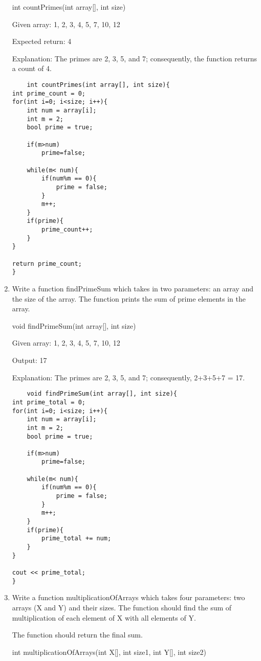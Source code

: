 \documentclass{article}
\begin{document}
\begin{enumerate}
int countPrimes(int array[], int size)

Given array: {1, 2, 3, 4, 5, 7, 10, 12}

Expected return: 4

Explanation: The primes are 2, 3, 5, and 7; consequently, the function returns a count of 4.

\begin{lstlisting}
	int countPrimes(int array[], int size){
int prime_count = 0;
for(int i=0; i<size; i++){
    int num = array[i];
    int m = 2;
    bool prime = true;
    
    if(m>num)
        prime=false;
    
    while(m< num){
        if(num%m == 0){
            prime = false;
        }
        m++;
    }
    if(prime){
        prime_count++;
    }
}

return prime_count;
}
\end{lstlisting}
\item Write a function findPrimeSum which takes in two parameters: an array and the size of the array. The function prints the sum of prime elements in the array.

void findPrimeSum(int array[], int size)

Given array: {1, 2, 3, 4, 5, 7, 10, 12}

Output: 17


Explanation: The primes are 2, 3, 5, and 7; consequently, 2+3+5+7 = 17.
\begin{lstlisting}
	void findPrimeSum(int array[], int size){
int prime_total = 0;
for(int i=0; i<size; i++){
    int num = array[i];
    int m = 2;
    bool prime = true;
    
    if(m>num)
        prime=false;
    
    while(m< num){
        if(num%m == 0){
            prime = false;
        }
        m++;
    }
    if(prime){
        prime_total += num;
    }
}

cout << prime_total;
}
\end{lstlisting}

\item Write a function multiplicationOfArrays which takes four parameters: two arrays (X and Y) and their sizes. The function should find the sum of multiplication of each element of X with all elements of Y.

The function should return the final sum.

int multiplicationOfArrays(int X[], int size1, int Y[], int size2)


\end{enumerate}
\end{document}
